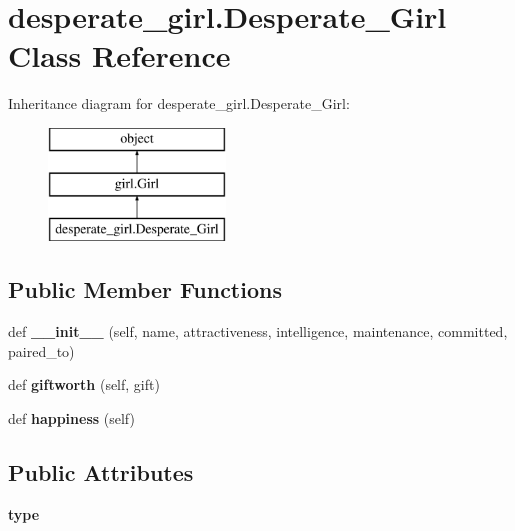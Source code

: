 \hypertarget{classdesperate__girl_1_1_desperate___girl}{}\section{desperate\+\_\+girl.\+Desperate\+\_\+\+Girl Class Reference}
\label{classdesperate__girl_1_1_desperate___girl}
Inheritance diagram for desperate\+\_\+girl.\+Desperate\+\_\+\+Girl\+:\begin{figure}[H]
\begin{center}
\leavevmode
\includegraphics[height=3.000000cm]{classdesperate__girl_1_1_desperate___girl}
\end{center}
\end{figure}
\subsection*{Public Member Functions}
\begin{DoxyCompactItemize}
\item 
\mbox{\label{classdesperate__girl_1_1_desperate___girl_ab79e28f51333e510187e105106ec8dca}} 
def {\bfseries \+\_\+\+\_\+init\+\_\+\+\_\+} (self, name, attractiveness, intelligence, maintenance, committed, paired\+\_\+to)
\item 
\mbox{\label{classdesperate__girl_1_1_desperate___girl_ad840fc289e5dc74f86133a429f3b145d}} 
def {\bfseries giftworth} (self, gift)
\item 
\mbox{\label{classdesperate__girl_1_1_desperate___girl_af80bc07443149f82a9d17d2f86a0c06a}} 
def {\bfseries happiness} (self)
\end{DoxyCompactItemize}
\subsection*{Public Attributes}
\begin{DoxyCompactItemize}
\item 
\mbox{\label{classdesperate__girl_1_1_desperate___girl_a55e8038abc86bd1a207878a70dac24c7}} 
{\bfseries type}
\end{DoxyCompactItemize}


